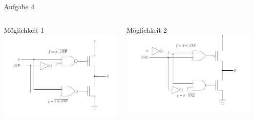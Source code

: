 \documentclass{beamer}
\begin{document}
    \begin{frame}{Aufgabe 4}{}
      \begin{columns}
        \begin{column}{0.5\textwidth}
          \begin{block}{Möglichkeit 1}
            \includegraphics[scale=0.325]{./figures/Tristate-Treiber-Schlatkreis.png}
          \end{block}
        \end{column}
        \begin{column}{0.5\textwidth}
          \begin{block}{Möglichkeit  2}
            \includegraphics[scale=0.325]{./figures/Tristate-Treiber-Schlatkreis-Alternative.png}\\
          \end{block}
        \end{column}
      \end{columns}
    \end{frame}
 
\end{document}
